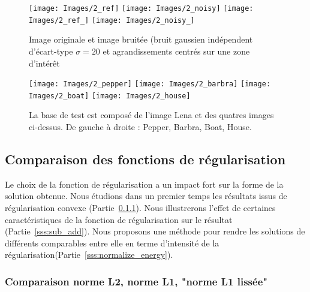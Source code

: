 \documentclass[../main/These_Mathias_Paget.tex]{subfiles}
\begin{document}
\begin{figure}
\centering
\texttt{[image: Images/2\_ref]}
\texttt{[image: Images/2\_noisy]}
\hspace{10 pt}
\texttt{[image: Images/2\_ref\_]}
\texttt{[image: Images/2\_noisy\_]}
\caption{Image originale et image bruitée (bruit gaussien indépendent d'écart-type $\sigma=20$ et agrandissements centrés sur une zone d’intérêt}
\label{fig:lena}
\end{figure}

\begin{figure}
\centering
\texttt{[image: Images/2\_pepper]}
\texttt{[image: Images/2\_barbra]}
\texttt{[image: Images/2\_boat]}
\texttt{[image: Images/2\_house]}
\caption{La base de test est composé de l'image Lena et des quatres images ci-dessus. De gauche à droite : Pepper, Barbra, Boat, House.}
\label{fig:denoise_base}
\end{figure}

\subsection{Comparaison des fonctions de régularisation}

Le choix de la fonction de régularisation a un impact fort sur la forme de la solution obtenue. Nous étudions dans un premier temps les résultats issus de régularisation convexe (Partie~\ref{sss:comp_reg_conv}). Nous illustrerons l'effet de certaines caractéristiques de la fonction de régularisation sur le résultat (Partie~\ref{sss:sub_add}). Nous proposons une méthode pour rendre les solutions de différents comparables entre elle en terme d'intensité de la régularisation(Partie~\ref{sss:normalize_energy}).

\subsubsection{Comparaison norme L2, norme L1, "norme L1 lissée"}
\label{sss:comp_reg_conv}
\end{document}
